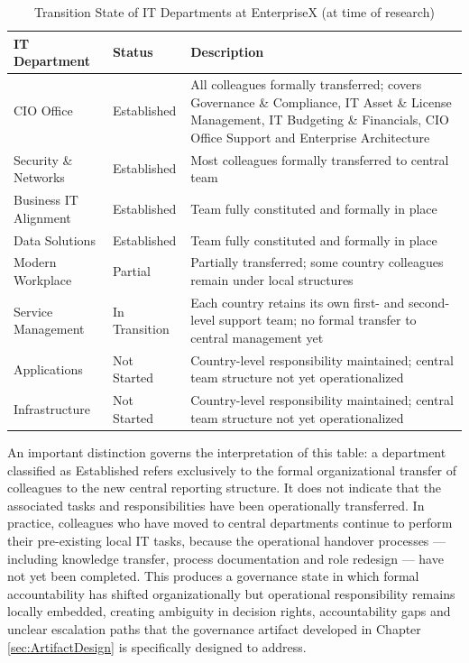 \begin{table}[H]
\centering
\caption{Transition State of IT Departments at EnterpriseX (at time of research)}
\label{tab:TransitionStateCh5}
\begin{tabularx}{\textwidth}{p{3.8cm} p{2.8cm} X}
\toprule
\textbf{IT Department} & \textbf{Status} & \textbf{Description} \\
\midrule
CIO Office & Established & All colleagues formally transferred; covers Governance \& Compliance, IT Asset \& License Management, IT Budgeting \& Financials, CIO Office Support and Enterprise Architecture \\
\addlinespace
Security \& Networks & Established & Most colleagues formally transferred to central team \\
\addlinespace
Business IT Alignment & Established & Team fully constituted and formally in place \\
\addlinespace
Data Solutions & Established & Team fully constituted and formally in place \\
\addlinespace
Modern Workplace & Partial & Partially transferred; some country colleagues remain under local structures \\
\addlinespace
Service Management & In Transition & Each country retains its own first- and second-level support team; no formal transfer to central management yet \\
\addlinespace
Applications & Not Started & Country-level responsibility maintained; central team structure not yet operationalized \\
\addlinespace
Infrastructure & Not Started & Country-level responsibility maintained; central team structure not yet operationalized \\
\bottomrule
\end{tabularx}
\end{table}

An important distinction governs the interpretation of this table: a department classified as \glqq{}Established\grqq{} refers exclusively to the formal organizational transfer of colleagues to the new central reporting structure.
It does not indicate that the associated tasks and responsibilities have been operationally transferred.
In practice, colleagues who have moved to central departments continue to perform their pre-existing local IT tasks, because the operational handover processes — including knowledge transfer, process documentation and role redesign — have not yet been completed.
This produces a governance state in which formal accountability has shifted organizationally but operational responsibility remains locally embedded, creating ambiguity in decision rights, accountability gaps and unclear escalation paths that the governance artifact developed in Chapter \ref{sec:ArtifactDesign} is specifically designed to address.

